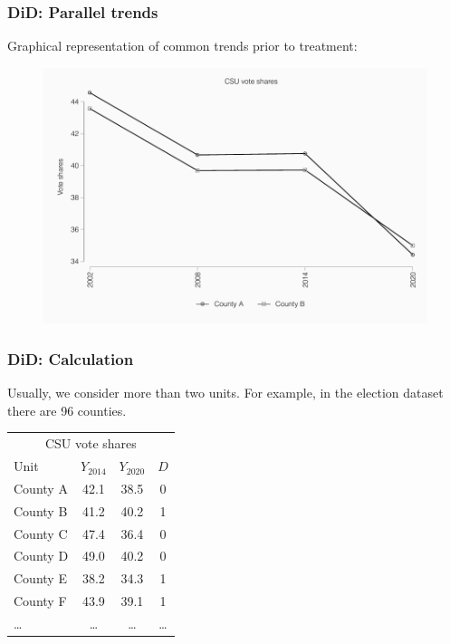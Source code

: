 \documentclass[12pt,english,dvipsnames,aspectratio=169,handout]{beamer}\usepackage[]{graphicx}\usepackage[]{xcolor}
\begin{document}
\begin{frame}
  \frametitle{DiD: Parallel trends}
\footnotesize

Graphical representation of common trends prior to treatment:
	 \begin{figure} 
    \includegraphics[height=.7\textheight,keepaspectratio=true]{../04-figures/08/02-fourperiod.pdf}
    \end{figure}
\end{frame}


\begin{frame}
  \frametitle{DiD: Calculation}
\footnotesize

Usually, we consider more than two units. For example, in the election dataset there are 96 counties.

\scriptsize
\begin{table}\centering
\begin{tabular}{lccc}
\toprule
\multicolumn{4}{c}{CSU vote shares } \\
Unit    & $Y_{2014}$  & $Y_{2020}$  & $D$  \\
\midrule
County A &  42.1     &    38.5   & 0         \\
County B &  41.2     &    40.2   & 1         \\
County C &  47.4     &    36.4   & 0         \\
County D &  49.0     &    40.2   & 0         \\
County E &  38.2     &    34.3   & 1         \\
County F &  43.9     &    39.1   & 1         \\
\ldots  &   \ldots  &  \ldots    & \ldots    \\
\bottomrule
\end{tabular}
\end{table}

\end{frame}
\end{document}
